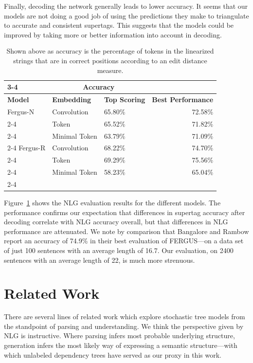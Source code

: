 \documentclass[11pt]{article}
\begin{document}
Finally, decoding the network generally leads to lower accuracy.
%
It seems that our models are not doing a good job of using the
predictions they make to triangulate to accurate and consistent
supertags. 
%
This suggests that the models could be improved by taking more or
better information into account in decoding.

\begin{table}
\centering
\begin{tabular}{|l|p{3cm}|p{2.5cm}|r|}
\cline{3-4}
\multicolumn{2}{}{} & \multicolumn{2}{|c|}{Accuracy}   \\ \hline
\textbf{Model} & \textbf{Embedding}  & \textbf{Top Scoring} & \textbf{Best Performance} \\ \hline
Fergus-N & Convolution & 65.80\% & 72.58\% \\ \cline{2-4}
         & Token       & 65.52\%  & 71.82\% \\ \cline{2-4}
         & Minimal Token & 63.79\% & 71.09\% \\ \cline{2-4}
\hline
Fergus-R & Convolution & 68.22\% & 74.70\% \\ \cline{2-4}
         & Token       &  69.29\% & 75.56\% \\ \cline{2-4}
         & Minimal Token &  58.23\% & 65.04\% \\ \cline{2-4}
\hline
\end{tabular}
\caption{Shown above as accuracy is the percentage of tokens in the linearized strings that are in correct positions according to an edit distance measure.}
\label{table:linresults}
\end{table}

Figure~\ref{table:linresults} shows the NLG evaluation results for the
different models.
%
The performance confirms our expectation that differences in supertag
accuracy after decoding correlate with NLG accuracy overall, but that
differences in NLG performance are attenuated.
%
We note by comparison that Bangalore and Rambow report an accuracy of
74.9\% in their best evaluation of FERGUS---on a data set of just 100
sentences with an average length of 16.7.
%
Our evaluation, on 2400 sentences with an average length of 22, is much
more strenuous.

\section{Related Work}
\label{sec:relatedwork}




There are several lines of related work which explore stochastic tree
models from the standpoint of parsing and understanding.
%
We think the perspective given by NLG is instructive.
%
Where parsing infers most probable underlying structure, generation infers the most likely way of expressing a semantic structure---with which unlabeled dependency trees have served as our proxy in this work. 
\end{document}

